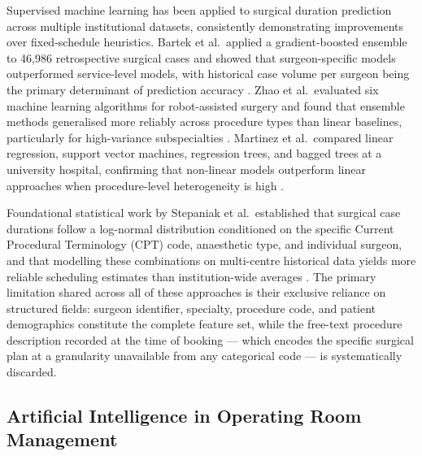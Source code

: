 \documentclass[3p]{elsarticle}
\begin{document}
Supervised machine learning has been applied to surgical duration prediction across multiple institutional datasets, consistently demonstrating improvements over fixed-schedule heuristics. Bartek et al.\ applied a gradient-boosted ensemble to 46{,}986 retrospective surgical cases and showed that surgeon-specific models outperformed service-level models, with historical case volume per surgeon being the primary determinant of prediction accuracy \cite{bartek2019improving}. Zhao et al.\ evaluated six machine learning algorithms for robot-assisted surgery and found that ensemble methods generalised more reliably across procedure types than linear baselines, particularly for high-variance subspecialties \cite{zhao2019machine}. Martinez et al.\ compared linear regression, support vector machines, regression trees, and bagged trees at a university hospital, confirming that non-linear models outperform linear approaches when procedure-level heterogeneity is high \cite{martinez2021machine}.

Foundational statistical work by Stepaniak et al.\ established that surgical case durations follow a log-normal distribution conditioned on the specific Current Procedural Terminology (CPT) code, anaesthetic type, and individual surgeon, and that modelling these combinations on multi-centre historical data yields more reliable scheduling estimates than institution-wide averages \cite{stepaniak2009modeling,stepaniak2010modeling}. The primary limitation shared across all of these approaches is their exclusive reliance on structured fields: surgeon identifier, specialty, procedure code, and patient demographics constitute the complete feature set, while the free-text procedure description recorded at the time of booking — which encodes the specific surgical plan at a granularity unavailable from any categorical code — is systematically discarded.

\subsection{Artificial Intelligence in Operating Room Management}
\label{sec:rw_or}
\end{document}
